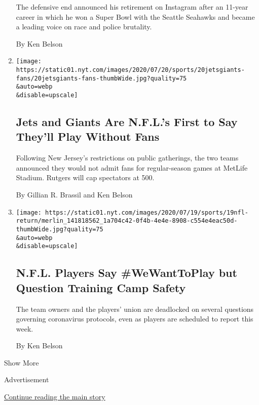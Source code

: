 \begin{enumerate}
  The defensive end announced his retirement on Instagram after an
  11-year career in which he won a Super Bowl with the Seattle Seahawks
  and became a leading voice on race and police brutality.

  By Ken Belson
\item
  \href{/2020/07/20/sports/football/jets-giants-rutgers-fans-metlife-stadium.html}{}

  \texttt{[image: https://static01.nyt.com/images/2020/07/20/sports/20jetsgiants-fans/20jetsgiants-fans-thumbWide.jpg?quality=75\\\&auto=webp\\\&disable=upscale]}

  \hypertarget{jets-and-giants-are-nfls-first-to-say-theyll-play-without-fans}{%
  \subsection{Jets and Giants Are N.F.L.'s First to Say They'll Play
  Without
  Fans}\label{jets-and-giants-are-nfls-first-to-say-theyll-play-without-fans}}

  Following New Jersey's restrictions on public gatherings, the two
  teams announced they would not admit fans for regular-season games at
  MetLife Stadium. Rutgers will cap spectators at 500.

  By Gillian R. Brassil and Ken Belson
\item
  \href{/2020/07/20/sports/football/nfl-training-camp-players.html}{}

  \texttt{[image: https://static01.nyt.com/images/2020/07/19/sports/19nfl-return/merlin\_141818562\_1a704c42-0f4b-4e4e-8908-c554e4eac50d-thumbWide.jpg?quality=75\\\&auto=webp\\\&disable=upscale]}

  \hypertarget{nfl-players-say-wewanttoplay-but-question-training-camp-safety}{%
  \subsection{N.F.L. Players Say \#WeWantToPlay but Question Training
  Camp
  Safety}\label{nfl-players-say-wewanttoplay-but-question-training-camp-safety}}

  The team owners and the players' union are deadlocked on several
  questions governing coronavirus protocols, even as players are
  scheduled to report this week.

  By Ken Belson
\end{enumerate}

Show More

Advertisement

\protect\hyperlink{after-mid1}{Continue reading the main story}

